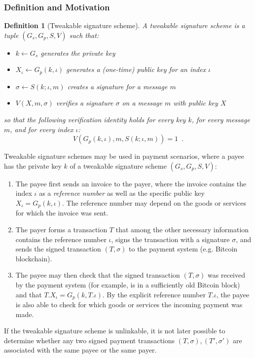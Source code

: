 \documentclass{article}
\newtheorem{definition}{Definition}[section]
\begin{document}
\subsubsection{Definition and Motivation}

\begin{definition}[Tweakable signature scheme]
A tweakable signature scheme is a tuple $(G_s,G_p,S,V)$ such that:
\begin{itemize}
\item $k\gets G_s$ generates the private key
\item $X_\iota\gets G_p(k,\iota)$ generates a (one-time) public key for an index $\iota$
\item $\sigma\gets S(k;\iota,m)$ creates a signature for a message $m$
\item $V(X,m,\sigma)$ verifies a signature $\sigma$ on a message $m$ with public key $X$
\end{itemize}
so that the following verification identity holds for every key $k$, for every message $m$, and for every index $\iota$:
\[
V(G_p(k,\iota),m,S(k;\iota,m))=1\enspace.
\]
\end{definition}
Tweakable signature schemes may be used in payment scenarios, where a payee has the private key $k$ of a tweakable signature scheme
$(G_s,G_p,S,V)$:
\begin{enumerate}
\item The payee first sends an invoice to the payer, where the invoice contains the index $\iota$ as a \emph{reference number} as well as the specific public key $X_\iota =G_p(k,\iota)$. The reference number may depend on the goods or services for which the invoice was sent.
\item The payer forms a transaction $T$ that among the other necessary information contains the reference number $\iota$, signs the transaction with a signature $\sigma$, and sends the signed transaction $(T,\sigma)$ to the payment system (e.g. Bitcoin blockchain).
\item The payee may then check that the signed transaction $(T,\sigma)$ was received by the payment system (for example, is in a sufficiently old Bitcoin block) and that
$T.X_\iota=G_p(k,T.\iota)$. By the explicit reference number $T.\iota$, the payee is also able to check for which goods or services the incoming payment was made.
\end{enumerate}
If the tweakable signature scheme is unlinkable, it is not later possible to determine whether any two signed payment transactions $(T,\sigma), (T',\sigma')$
are associated with the same payee or the same payer.
\end{document}
